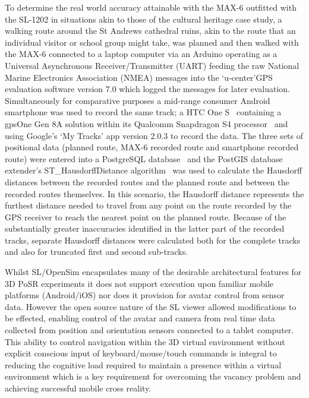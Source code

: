 To determine the real world accuracy attainable with the MAX-6 outfitted with the SL-1202 in situations akin to those of the cultural heritage case study, a walking route around the St Andrews cathedral ruins, akin to the route that an individual visitor or school group might take, was planned and then walked with the MAX-6 connected to a laptop computer via an Arduino operating as a Universal Asynchronous Receiver/Transmitter (UART) feeding the raw National Marine Electronics Association (NMEA) messages into the `u-center'GPS evaluation software version 7.0 which logged the messages for later evaluation. Simultaneously for comparative purposes a mid-range consumer Android smartphone was used to record the same track; a HTC One S~\cite{HTCCorporation2013} containing a gpsOne Gen 8A solution within its Qualcomm Snapdragon S4 processor~\cite{QualcommIncorporated2013} and using Google's `My Tracks' app version 2.0.3 to record the data. The three sets of positional data (planned route, MAX-6 recorded route and smartphone recorded route) were entered into a PostgreSQL database~\cite{Daviesc,Daviesb} and the PostGIS database extender's ST\_HausdorffDistance algorithm~\cite{PostGIS} was used to calculate the Hausdorff distances between the recorded routes and the planned route and between the recorded routes themselves. In this scenario, the Hausdorff distance represents the furthest distance needed to travel from any point on the route recorded by the GPS receiver to reach the nearest point on the planned route. Because of the substantially greater inaccuracies identified in the latter part of the recorded tracks, separate Hausdorff distances were calculated both for the complete tracks and also for truncated first and second sub-tracks.

Whilst SL/OpenSim encapsulates many of the desirable architectural features for 3D PoSR experiments it does not support execution upon familiar mobile platforms (Android/iOS) nor does it provision for avatar control from sensor data. However the open source nature of the SL viewer allowed modifications to be effected, enabling control of the avatar and camera from real time data collected from position and orientation sensors connected to a tablet computer. This ability to control navigation within the 3D virtual environment without explicit conscious input of keyboard/mouse/touch commands is integral to reducing the cognitive load required to maintain a presence within a virtual environment which is a key requirement for overcoming the vacancy problem and achieving successful mobile cross reality.

